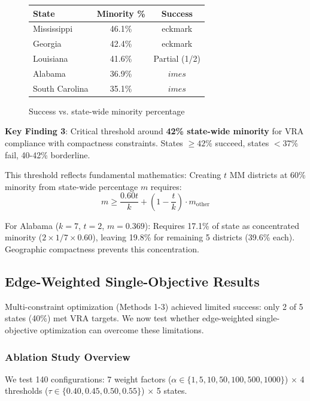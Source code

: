\begin{figure}[h]
\centering
\begin{tabular}{lcc}
\toprule
State & Minority \% & Success \\
\midrule
Mississippi & 46.1\% &  eckmark \\
Georgia & 42.4\% &  eckmark \\
Louisiana & 41.6\% & Partial (1/2) \\
Alabama & 36.9\% & $	imes$ \\
South Carolina & 35.1\% & $	imes$ \\
\bottomrule
\end{tabular}
\caption{Success vs. state-wide minority percentage}
\label{fig:threshold}
\end{figure}

\textbf{Key Finding 3}: Critical threshold around \textbf{42\% state-wide minority} for VRA compliance with compactness constraints. States $\geq 42\%$ succeed, states $<37\%$ fail, 40-42\% borderline.

This threshold reflects fundamental mathematics: Creating $t$ MM districts at 60\% minority from state-wide percentage $m$ requires:
\begin{equation}
m \geq \frac{0.60t}{k} + (1 - \frac{t}{k}) \cdot m_{\text{other}}
\end{equation}

For Alabama ($k=7$, $t=2$, $m=0.369$): Requires 17.1\% of state as concentrated minority ($2 \times 1/7 \times 0.60$), leaving 19.8\% for remaining 5 districts (39.6\% each). Geographic compactness prevents this concentration.

\subsection{Edge-Weighted Single-Objective Results}

Multi-constraint optimization (Methods 1-3) achieved limited success: only 2 of 5 states (40\%) met VRA targets. We now test whether edge-weighted single-objective optimization can overcome these limitations.

\subsubsection{Ablation Study Overview}

We test 140 configurations: 7 weight factors ($\alpha \in \{1, 5, 10, 50, 100, 500, 1000\}$) $\times$ 4 thresholds ($\tau \in \{0.40, 0.45, 0.50, 0.55\}$) $\times$ 5 states.

